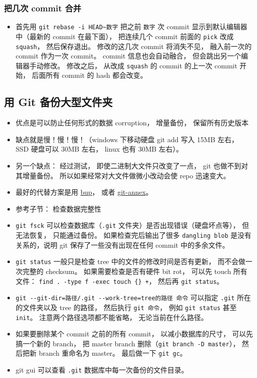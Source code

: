 \subsubsection{把几次 commit 合并}
\begin{itemize}
\item 首先用 \verb|git rebase -i HEAD~数字| 把之前 \verb|数字| 次 commit 显示到默认编辑器中（最新的 commit 在最下面）， 把连续几个 commit 前面的 \verb|pick| 改成 \verb|squash|， 然后保存退出。 修改的这几次 commit 将消失不见， 融入前一次的 commit 作为一次 commit。 commit 信息也会自动融合， 但会跳出另一个编辑器手动修改。 修改之后， 从改成 \verb|squash| 的 commit 的上一次 commit 开始， 后面所有 commit 的 hash 都会改变。
\end{itemize}


\subsection{用 Git 备份大型文件夹}
\begin{itemize}
\item 优点是可以防止任何形式的数据 corruption， 增量备份， 保留所有历史版本
\item 缺点就是慢！慢！慢！（windows 下移动硬盘 git add 写入 15MB 左右， SSD 硬盘可以 30MB 左右， linux 也有 30MB 左右）。
\item 另一个缺点： 经过测试， 即使二进制大文件只改变了一点， git 也做不到对其增量备份。 所以如果经常对大文件做微小改动会使 repo 迅速变大。
\item 最好的代替方案是用 \href{https://bup.github.io/}{bup}， 或者 \href{https://git-annex.branchable.com/}{git-annex}。
\item 参考子节： 检查数据完整性
\item \verb|git fsck| 可以检查数据库（\verb|.git| 文件夹）是否出现错误（硬盘坏点等）， 但无法恢复， 只能通过备份。 如果检查完后输出了很多 \verb|dangling blob| 是没有关系的，说明 git 保存了一些没有出现在任何 commit 中的多余文件。
\item \verb|git status| 一般只是检查 tree 中的文件的修改时间是否有更新， 而不会做一次完整的 checksum。 如果需要检查是否有硬件 bit rot， 可以先 touch 所有文件： \verb|find . -type f -exec touch {} +|， 然后再 \verb|git status|。
\item \verb|git --git-dir=路径/.git --work-tree=tree的路径 命令| 可以指定 \verb|.git| 所在的文件夹以及 tree 的路径， 然后执行 \verb|git 命令|， 例如 \verb|git status| 甚至 \verb|init|。 注意两个路径选项都不能省略， 无论当前在什么路径。
\item 如果要删除某个 commit 之前的所有 commit， 以减小数据库的尺寸， 可以先搞一个新的 branch， 把 master branch 删除（\verb|git branch -D master|）， 然后把新 branch 重命名为 master。 最后做一下 \verb|git gc|。
\item git gui 可以查看 \verb|.git| 数据库中每一次备份的文件目录。
\end{itemize}

